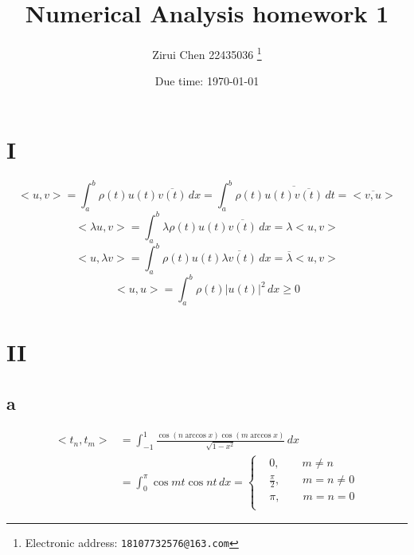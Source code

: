 \documentclass[a4paper]{article}
\begin{document}
\title{Numerical Analysis homework 1}

\author{Zirui Chen 22435036
  \thanks{Electronic address: \texttt{18107732576@163.com}}}


\date{Due time: \today}

\maketitle






\section*{I}
$$<u,v> = \int_{a}^{b} \rho(t)u(t)\overline{v(t)} \,dx = \int_{a}^{b} \rho(t)\overline{u(t)\overline{ v(t)}} \,dt =  \overline{<v,u>} $$
$$<\lambda u,v> = \int_{a}^{b} \lambda \rho(t)u(t)\overline{v(t)} \,dx = \lambda <u,v>$$
$$<u,\lambda v> = \int_{a}^{b} \rho(t)u(t)\overline{\lambda v(t)} \,dx = \overline{\lambda}<u,v>$$
$$<u,u> = \int_{a}^{b} \rho(t)\left\lvert u(t)\right\rvert^{2}  \,dx \geq 0 $$

\section*{II}

\subsection*{a}
\begin{align}
    <t_{n}, t_{m}> &= \int_{-1}^{1} \frac{\cos (n\arccos x) \cos (m\arccos x)}{\sqrt{1-x^{2}} } \,dx \\
                   &= \int_{0}^{\pi } \cos mt \cos nt \,dx =
                   \left\{
                    \begin{array}{rl}
                    &0, \qquad m \neq n \\
                    &\frac{\pi}{2}, \qquad m = n \neq 0\\
                    &\pi, \qquad m = n = 0 \\
                    \end{array}
                    \right.
\end{align}
\end{document}
